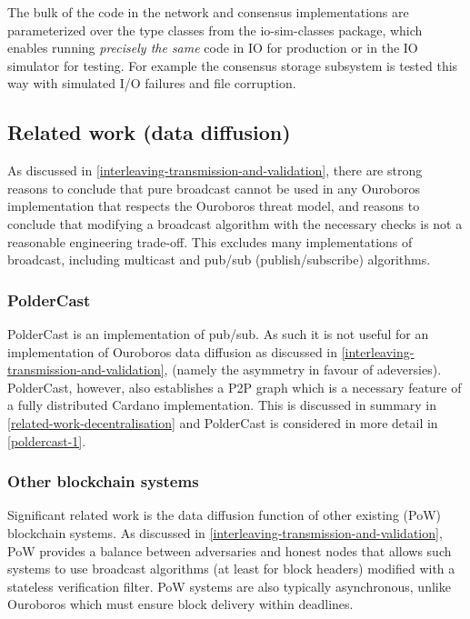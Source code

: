 \documentclass[11pt,a4paper]{article}
\begin{document}
The bulk of the code in the network and consensus implementations are
parameterized over the type classes from the io-sim-classes package,
which enables running \emph{precisely the same} code in IO for
production or in the IO simulator for testing. For example the consensus
storage subsystem is tested this way with simulated I/O failures and
file corruption.

\subsection{Related work (data diffusion)}
\label{related-work-data-diffusion}

As discussed in
\cref{interleaving-transmission-and-validation}, there are strong reasons to conclude that pure broadcast cannot
be used in any Ouroboros implementation that respects the Ouroboros
threat model, and reasons to conclude that modifying a broadcast
algorithm with the necessary checks is not a reasonable engineering
trade-off. This excludes many implementations of broadcast, including
multicast and pub/sub (publish/subscribe) algorithms.

\subsubsection{PolderCast}
\label{poldercast}

PolderCast \cite{SSVV12} is an implementation of pub/sub. As such it is
not useful for an implementation of Ouroboros data diffusion as
discussed in
\cref{interleaving-transmission-and-validation}, (namely the asymmetry in favour of adeversies). PolderCast,
however, also establishes a P2P graph which is a necessary feature of a
fully distributed Cardano implementation. This is discussed in summary
in \cref{related-work-decentralisation} and PolderCast is considered in
more detail in \cref{poldercast-1}.

\subsubsection{Other blockchain systems}
\label{other-blockchain-systems}

Significant related work is the data diffusion function of other
existing (PoW) blockchain systems. As discussed in
\cref{interleaving-transmission-and-validation}, PoW provides a balance between adversaries and honest nodes
that allows such systems to use broadcast algorithms (at least for block
headers) modified with a stateless verification filter. PoW systems are
also typically asynchronous, unlike Ouroboros which must ensure block
delivery within deadlines.
\end{document}
